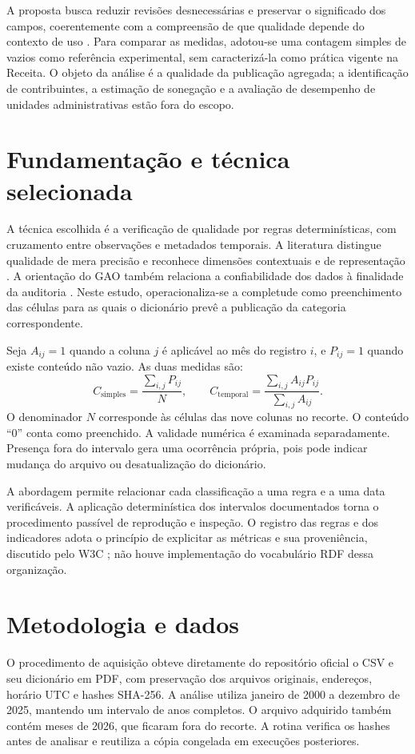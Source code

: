 \documentclass[12pt,a4paper]{article}
\begin{document}
A proposta busca reduzir revisões desnecessárias e preservar o significado
dos campos, coerentemente com a compreensão de que qualidade depende do
contexto de uso \cite{wang1996}. Para comparar as medidas, adotou-se uma
contagem simples de vazios como referência experimental, sem caracterizá-la
como prática vigente na Receita. O objeto da análise é a qualidade da
publicação agregada; a identificação de contribuintes, a estimação de sonegação
e a avaliação de desempenho de unidades administrativas estão fora do escopo.

\section{Fundamentação e técnica selecionada}
A técnica escolhida é a verificação de qualidade por regras determinísticas,
com cruzamento entre observações e metadados temporais. A literatura distingue
qualidade de mera precisão e reconhece dimensões contextuais e de representação
\cite{wang1996}. A orientação do GAO também relaciona a confiabilidade dos
dados à finalidade da auditoria \cite{gao2019}. Neste estudo, operacionaliza-se
a completude como preenchimento das células para as quais o dicionário prevê
a publicação da categoria correspondente.

Seja $A_{ij}=1$ quando a coluna $j$ é aplicável ao mês do registro $i$, e
$P_{ij}=1$ quando existe conteúdo não vazio. As duas medidas são:
\[
C_{\mathrm{simples}}=\frac{\sum_{i,j}P_{ij}}{N},\qquad
C_{\mathrm{temporal}}=\frac{\sum_{i,j}A_{ij}P_{ij}}{\sum_{i,j}A_{ij}}.
\]
O denominador $N$ corresponde às células das nove colunas no recorte. O conteúdo
``0'' conta como preenchido. A validade numérica é examinada separadamente.
Presença fora do intervalo gera uma ocorrência própria, pois pode indicar
mudança do arquivo ou desatualização do dicionário.

A abordagem permite relacionar cada classificação a uma regra e a uma data
verificáveis. A aplicação determinística dos intervalos documentados torna
o procedimento passível de reprodução e inspeção. O registro das regras e dos indicadores
adota o princípio de explicitar as métricas e sua proveniência, discutido pelo
W3C \cite{w3c2016}; não houve implementação do vocabulário RDF dessa organização.

\section{Metodologia e dados}
O procedimento de aquisição obteve diretamente do repositório oficial o CSV e seu dicionário em PDF,
com preservação dos arquivos originais, endereços, horário UTC e hashes SHA-256.
A análise utiliza janeiro de 2000 a dezembro de 2025, mantendo um intervalo de
anos completos. O arquivo adquirido também contém meses de 2026, que ficaram
fora do recorte. A rotina verifica os hashes antes de analisar e reutiliza a
cópia congelada em execuções posteriores.
\end{document}
